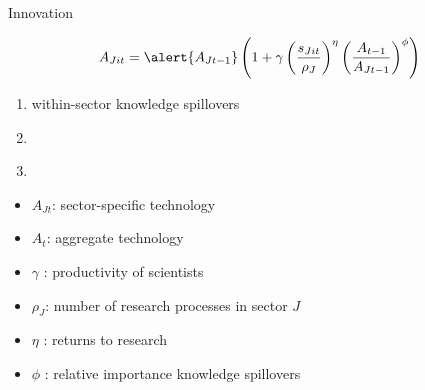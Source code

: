 \documentclass[11pt,aspectratio=169]{beamer}
\begin{document}
\addtocounter{framenumber}{-1}
\begin{frame}{Innovation}

	\vspace{-5mm}
	\large
	\begin{align*}
		A_{Jit}=\alert{A_{Jt-1}}\left(1+\gamma\left(\frac{s_{Jit}}{\rho_J}\right)^\eta\left(\frac{A_{t-1}}{A_{Jt-1}}\right)^\phi\right)
	\end{align*}
	\normalsize
	\begin{enumerate}
		\item \alert{within-sector knowledge spillovers} %
		\item[] \  %
		\item[] \  %
	\end{enumerate}
	\small
	\vspace{4mm}
	\hspace{-2mm}
	\begin{minipage}[t!]{0.43\textwidth}
		\vspace{0mm}
		\begin{itemize}
			\item[] $A_{Jt}$: sector-specific technology
			\vspace{-2mm}		
			\item[] $A_t$: aggregate technology
			\vspace{-2mm}
			\item[] $\gamma$ : productivity of scientists
		\end{itemize}
	\end{minipage}
	\vspace{-5mm}
	\begin{minipage}[t!]{0.55\textwidth}
		\vspace{0mm}
		\begin{itemize}	
			\item[] $\rho_J$: number of research processes in sector $J$
			\vspace{-2mm}			
			\item[] $\eta$ : returns to research
			\vspace{-2mm}			
			\item[] $\phi$ : relative importance knowledge spillovers
		\end{itemize}
	\end{minipage}
\end{frame}
\end{document}
